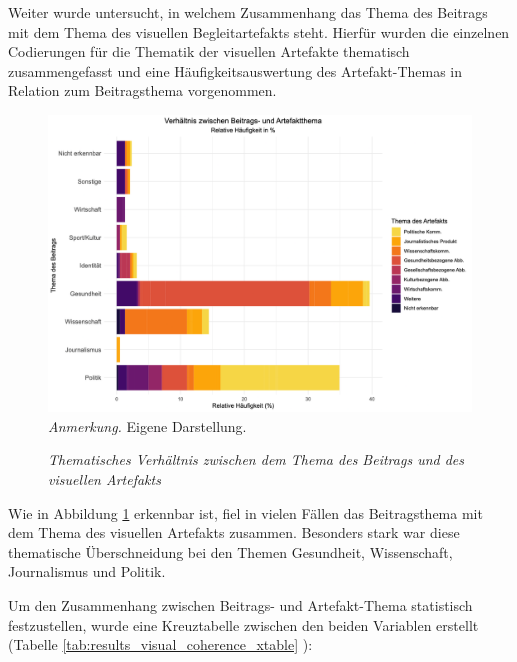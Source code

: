 \documentclass[12pt,a4paper]{article}        %
\begin{document}
Weiter wurde untersucht, in welchem Zusammenhang das Thema des Beitrags mit dem Thema des visuellen Begleitartefakts steht. Hierfür wurden die einzelnen Codierungen für die Thematik der visuellen Artefakte thematisch zusammengefasst und eine Häufigkeitsauswertung des Artefakt-Themas in Relation zum Beitragsthema vorgenommen.
\begin{figure}
  \caption{\textit{Thematisches Verhältnis zwischen dem Thema des Beitrags und des visuellen Artefakts}}
  \label{fig:results_visual_coherence_plot}
  \centering
  \includegraphics[width=1\linewidth]{images/visual_coherence_plot.png}
  \footnotesize\textit{Anmerkung.} Eigene Darstellung.
\end{figure}
Wie in Abbildung \ref{fig:results_visual_coherence_plot} erkennbar ist, fiel in vielen Fällen das Beitragsthema mit dem Thema des visuellen Artefakts zusammen. Besonders stark war diese thematische Überschneidung bei den Themen Gesundheit, Wissenschaft, Journalismus und Politik.

Um den Zusammenhang zwischen Beitrags- und Artefakt-Thema statistisch festzustellen, wurde eine Kreuztabelle zwischen den beiden Variablen erstellt (Tabelle \ref{tab:results_visual_coherence_xtable} ):
\end{document}
